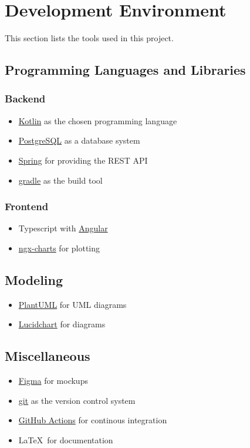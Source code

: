 \section{Development Environment}

This section lists the tools used in this project.

\subsection{Programming Languages and Libraries}

\subsubsection*{Backend}
\begin{itemize}
    \item \href{https://kotlinlang.org/}{Kotlin} as the chosen programming language
    \item \href{https://www.postgresql.org/}{PostgreSQL} as a database system
    \item \href{https://spring.io/}{Spring} for providing the \gls{REST API}
    \item \href{https://gradle.org/}{gradle} as the build tool
\end{itemize}

\subsubsection*{Frontend}
\begin{itemize}
    \item Typescript with \href{https://angular.io/}{Angular}
    \item \href{https://github.com/swimlane/ngx-charts}{ngx-charts} for plotting
\end{itemize}

\subsection{Modeling}
\begin{itemize}
    \item \href{https://plantuml.com/}{PlantUML} for UML diagrams
    \item \href{https://www.lucidchart.com/}{Lucidchart} for diagrams
\end{itemize}

\subsection{Miscellaneous}
\begin{itemize}
    \item \href{https://www.figma.com/}{Figma} for mockups
    \item \href{https://git-scm.com/}{git} as the version control system
    \item \href{https://github.com/features/actions}{GitHub Actions} for continous integration
    \item \LaTeX \ for documentation
\end{itemize}
